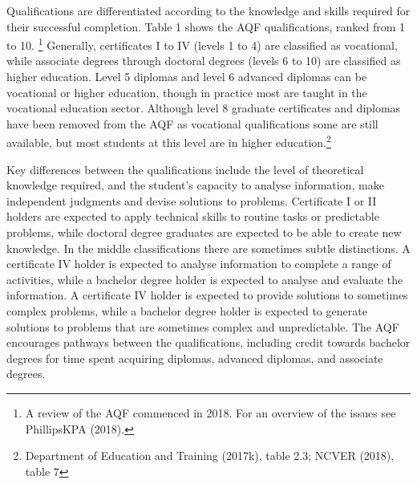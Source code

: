 \documentclass{grattan}
\begin{document}
Qualifications are differentiated according to the knowledge and skills required for their successful completion. Table 1 shows the AQF qualifications, ranked from 1 to 10. \footnote{A review of the AQF commenced in 2018. For an overview of the issues see PhillipsKPA (2018).} Generally, certificates I to IV (levels 1 to 4) are classified as vocational, while associate degrees through doctoral degrees (levels 6 to 10) are classified as higher education. Level 5 diplomas and level 6 advanced diplomas can be vocational or higher education, though in practice most are taught in the vocational education sector. Although level 8 graduate certificates and diplomas have been removed from the AQF as vocational qualifications some are still available, but most students at this level are in higher education.\footnote{Department of Education and Training (2017k), table 2.3; NCVER (2018), table 7}

\begin{table} \caption{Australian Qualifications Framework}


\end{table}

Key differences between the qualifications include the level of theoretical knowledge required, and the student's capacity to analyse information, make independent judgments and devise solutions to problems. Certificate I or II holders are expected to apply technical skills to routine tasks or predictable problems, while doctoral degree graduates are expected to be able to create new knowledge. In the middle classifications there are sometimes subtle distinctions. A certificate IV holder is expected to analyse information to complete a range of activities, while a bachelor degree holder is expected to analyse and evaluate the information. A certificate IV holder is expected to provide solutions to sometimes complex problems, while a bachelor degree holder is expected to generate solutions to problems that are sometimes complex and unpredictable. The AQF encourages pathways between the qualifications, including credit towards bachelor degrees for time spent acquiring diplomas, advanced diplomas, and associate degrees.
\end{document}

